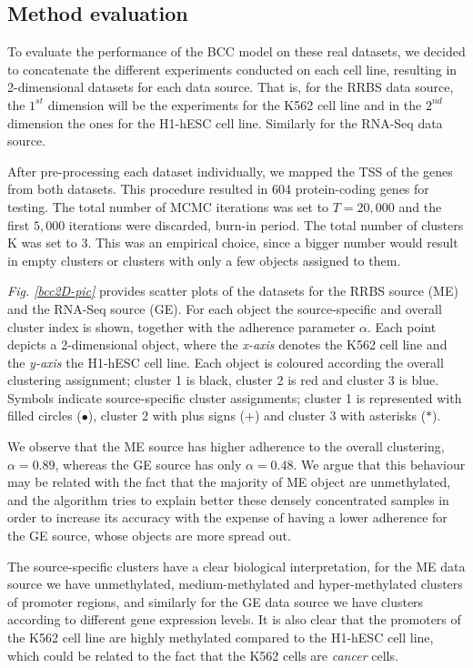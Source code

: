 \subsection{Method evaluation} \label{integr-method-eval-subsect}
To evaluate the performance of the BCC model on these real datasets, we decided to concatenate the different experiments conducted on each cell line, resulting in 2-dimensional datasets for each data source. That is, for the RRBS data source, the $1^{st}$ dimension will be the experiments for the K562 cell line and in the $2^{nd}$ dimension the ones for the H1-hESC cell line. Similarly for the RNA-Seq data source.

After pre-processing each dataset individually, we mapped the TSS of the genes from both datasets. This procedure resulted in 604 protein-coding genes for testing. The total number of MCMC iterations was set to $T=20,000$ and the first $5,000$ iterations were discarded, \ie burn-in period. The total number of clusters K was set to 3. This was an empirical choice, since a bigger number would result in empty clusters or clusters with only a few objects assigned to them. 

\emph{Fig. \ref{bcc2D-pic}} provides scatter plots of the datasets for the RRBS source (ME) and the RNA-Seq source (GE). For each object the source-specific and overall cluster index is shown, together with the adherence parameter $\alpha$. Each point depicts a 2-dimensional object, where the \emph{x-axis} denotes the K562 cell line and the \emph{y-axis} the H1-hESC cell line. Each object is coloured according the overall clustering assignment; cluster 1 is black, cluster 2 is red and cluster 3 is blue. Symbols indicate source-specific cluster assignments; cluster 1 is represented with filled circles ($\bullet$), cluster 2 with plus signs (+) and cluster 3 with asterisks ($\ast$). 

We observe that the ME source has higher adherence to the overall clustering, $\alpha=0.89$, whereas the GE source has only $\alpha=0.48$. We argue that this behaviour may be related with the fact that the majority of ME object are unmethylated, and the algorithm tries to explain better these densely concentrated samples in order to increase its accuracy with the expense of having a lower adherence for the GE source, whose objects are more spread out.

The source-specific clusters have a clear biological interpretation, for the ME data source we have unmethylated, medium-methylated and hyper-methylated clusters of promoter regions, and similarly for the GE data source we have clusters according to different gene expression levels. It is also clear that the promoters of the K562 cell line are highly methylated compared to the H1-hESC cell line, which could be related to the fact that the K562 cells are \emph{cancer} cells. 

